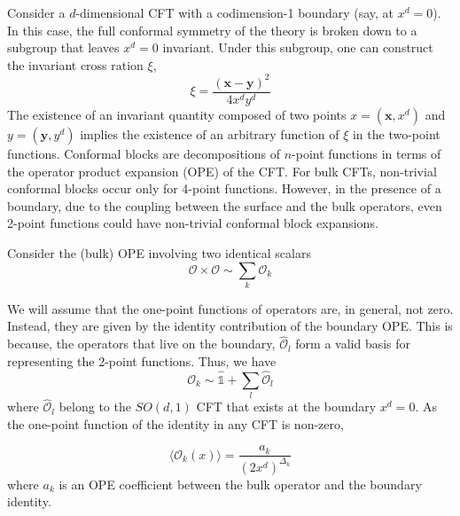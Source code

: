\documentclass[a4paper,11pt]{article}
\begin{document}
Consider a $d$-dimensional CFT with a codimension-1 boundary (say, at $x^d = 0$). In this case, the full conformal symmetry of the theory is broken down to a subgroup that leaves $x^d = 0$ invariant. Under this subgroup, one can construct the invariant cross ration $\xi$,
\begin{equation}
    \xi = \frac{(\textbf{x} - \textbf{y})^2}{4x^dy^d}
\end{equation}
The existence of an invariant quantity composed of two points $x = (\textbf{x}, x^d)$ and $y = (\textbf{y}, y^d)$ implies the existence of an arbitrary function of $\xi$ in the two-point functions. Conformal blocks are decompositions of $n$-point functions in terms of the operator product expansion (OPE) of the CFT. For bulk CFTs, non-trivial conformal blocks occur only for 4-point functions. However, in the presence of a boundary, due to the coupling between the surface and the bulk operators, even 2-point functions could have non-trivial conformal block expansions. 

Consider the (bulk) OPE involving two identical scalars
\begin{equation}
    \mathcal{O}\times\mathcal{O} \sim \sum_k\mathcal{O}_k
\end{equation}

We will assume that the one-point functions of operators are, in general, not zero. Instead, they are given by the identity contribution of the boundary OPE. This is because, the operators that live on the boundary, $\hat{\mathcal{O}}_l$ form a valid basis for representing the 2-point functions. Thus, we have
\begin{equation}
    \mathcal{O}_k \sim \hat{\mathds{1}} + \sum_l \hat{\mathcal{O}}_l
\end{equation}
where $\hat{\mathcal{O}}_l$ belong to the $SO(d,1)$ CFT that exists at the boundary $x^d = 0$. As the one-point function of the identity in any CFT is non-zero,

\begin{equation}
\label{eq:BOPE}
    \langle \mathcal{O}_k(x) \rangle = \frac{a_k}{(2x^d)^{\Delta_k}}
\end{equation}
where $a_k$ is an OPE coefficient between the bulk operator and the boundary identity. 
\end{document}
